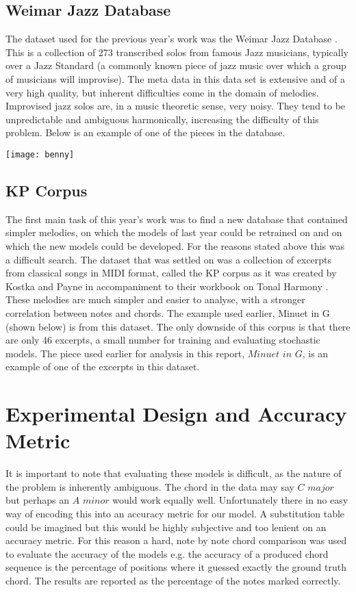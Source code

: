 \documentclass[bsc,singlespacing,logo, parskip, deptreport]{infthesis}
\begin{document}
\subsection{Weimar Jazz Database} \label{wjazz}
The dataset used for the previous year's work was the Weimar Jazz Database \cite{wjazz}. This is a collection of 273 transcribed solos from famous Jazz musicians, typically over a Jazz Standard (a commonly known piece of jazz music over which a group of musicians will improvise). The meta data in this data set is extensive and of a very high quality, but inherent difficulties come in the domain of melodies. Improvised jazz solos are, in a music theoretic sense, very noisy. They tend to be unpredictable and ambiguous harmonically, increasing the difficulty of this problem. Below is an example of one of the pieces in the database.

\texttt{[image: benny]}

\subsection{KP Corpus} \label{kp}
The first main task of this year's work was to find a new database that contained simpler melodies, on which the models of last year could be retrained on and on which the new models could be developed. For the reasons stated above this was a difficult search. The dataset that was settled on was a collection of excerpts from classical songs in MIDI format, called the KP corpus as it was created by Kostka and Payne in accompaniment to their workbook on Tonal Harmony \cite{kostka2009tonal}. These melodies are much simpler and easier to analyse, with a stronger correlation between notes and chords. The example used earlier, Minuet in G (shown below) is from this dataset. The only downside of this corpus is that there are only 46 excerpts, a small number for training and evaluating stochastic models. The piece used earlier for analysis in this report, $Minuet$ $in$ $G$, is an example of one of the excerpts in this dataset.

\section{Experimental Design and Accuracy Metric}

It is important to note that evaluating these models is difficult, as the nature of the problem is inherently ambiguous. The chord in the data may say $C$ $major$ but perhaps an $A$ $minor$ would work equally well. Unfortunately there in no easy way of encoding this into an accuracy metric for our model. A substitution table could be imagined but this would be highly subjective and too lenient on an accuracy metric. For this reason a hard, note by note chord comparison was used to evaluate the accuracy of the models e.g. the accuracy of a produced chord sequence is the percentage of positions where it guessed exactly the ground truth chord. The results are reported as the percentage of the notes marked correctly.
\end{document}
